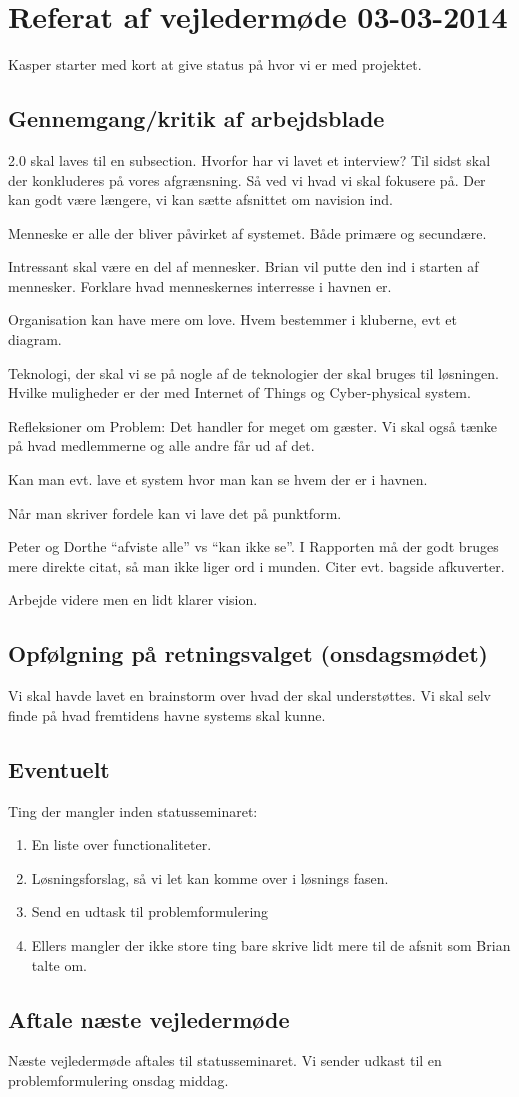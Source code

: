 \documentclass{article}
\begin{document}
\section{Referat af vejledermøde 03-03-2014}
Kasper starter med kort at give status på hvor vi er med projektet.

\subsection{Gennemgang/kritik af arbejdsblade}
2.0 skal laves til en subsection. Hvorfor har vi lavet et interview? Til sidst skal der konkluderes på vores afgrænsning. Så ved vi hvad vi skal fokusere på. Der kan godt være længere, vi kan sætte afsnittet om navision ind.

Menneske er alle der bliver påvirket af systemet. Både primære og secundære.

Intressant skal være en del af mennesker. Brian vil putte den ind i starten af mennesker. Forklare hvad menneskernes interresse i havnen er.

Organisation kan have mere om love. Hvem bestemmer i kluberne, evt et diagram.

Teknologi, der skal vi se på nogle af de teknologier der skal bruges til løsningen. Hvilke muligheder er der med Internet of Things og Cyber-physical system.

Refleksioner om Problem: Det handler for meget om gæster. Vi skal også tænke på hvad medlemmerne og alle andre får ud af det.

Kan man evt. lave et system hvor man kan se hvem der er i havnen.

Når man skriver fordele kan vi lave det på punktform.

Peter og Dorthe “afviste alle” vs “kan ikke se”. I Rapporten må der godt bruges mere direkte citat, så man ikke liger ord i munden. Citer evt. bagside afkuverter.

Arbejde videre men en lidt klarer vision.

\subsection{Opfølgning på retningsvalget (onsdagsmødet)}
Vi skal havde lavet en brainstorm over hvad der skal understøttes. Vi skal selv finde på hvad fremtidens havne systems skal kunne.

\subsection{Eventuelt}
Ting der mangler inden statusseminaret:
\begin{enumerate}
    \item En liste over functionaliteter.
    \item Løsningsforslag, så vi let kan komme over i løsnings fasen.
    \item Send en udtask til problemformulering
    \item Ellers mangler der ikke store ting bare skrive lidt mere til de afsnit som Brian talte om.
\end{enumerate}

\subsection{Aftale næste vejledermøde}
Næste vejledermøde aftales til statusseminaret. Vi sender udkast til en problemformulering onsdag middag.
\end{document}
